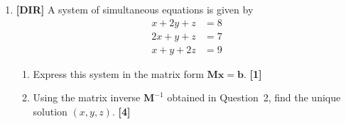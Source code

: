\documentclass[11pt,a4paper]{article}
\begin{document}
\begin{enumerate}
\item \textbf{[DIR]} A system of simultaneous equations is given by
\[
\begin{aligned}
x + 2y + z &= 8 \\
2x + y + z &= 7 \\
x + y + 2z &= 9
\end{aligned}
\]
\begin{enumerate}
  \item Express this system in the matrix form $\mathbf{M}\mathbf{x} = \mathbf{b}$. \hfill{\small\textbf{[1]}}
  \item Using the matrix inverse $\mathbf{M}^{-1}$ obtained in Question~2, find the unique solution $(x, y, z)$. \hfill{\small\textbf{[4]}}
\end{enumerate}

\end{enumerate}
\end{document}

